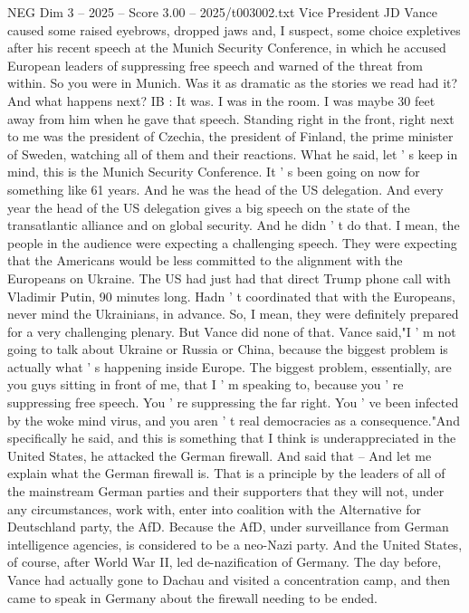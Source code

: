 \begin{textsample}{NEG Dim 3 – 2025 – Score 3.00 – 2025/t003002.txt}
Vice President JD Vance caused some raised eyebrows, dropped jaws and, I suspect, some choice expletives after his recent speech at the Munich Security Conference, in which he accused European leaders of suppressing free speech and warned of the threat from within.
So you were in Munich.
Was it as dramatic as the stories we read had it?
And what happens next?
IB : It was.
I was in the room.
I was maybe 30 feet away from him when he gave that speech.
Standing right in the front, right next to me was the president of Czechia, the president of Finland, the prime minister of Sweden, watching all of them and their reactions.
What he said, let ' s keep in mind, this is the Munich Security Conference.
It ' s been going on now for something like 61 years.
And he was the head of the US delegation.
And every year the head of the US delegation gives a big speech on the state of the transatlantic alliance and on global security.
And he didn ' t do that.
I mean, the people in the audience were expecting a challenging speech.
They were expecting that the Americans would be less committed to the alignment with the Europeans on Ukraine.
The US had just had that direct Trump phone call with Vladimir Putin, 90 minutes long.
Hadn ' t coordinated that with the Europeans, never mind the Ukrainians, in advance.
So, I mean, they were definitely prepared for a very challenging plenary.
But Vance did none of that.
Vance said,"I ' m not going to talk about Ukraine or Russia or China, because the biggest problem is actually what ' s happening inside Europe.
The biggest problem, essentially, are you guys sitting in front of me, that I ' m speaking to, because you ' re suppressing free speech.
You ' re suppressing the far right.
You ' ve been infected by the woke mind virus, and you aren ' t real democracies as a consequence."And specifically he said, and this is something that I think is underappreciated in the United States, he attacked the German firewall.
And said that -- And let me explain what the German firewall is.
That is a principle by the leaders of all of the mainstream German parties and their supporters that they will not, under any circumstances, work with, enter into coalition with the Alternative for Deutschland party, the AfD.
Because the AfD, under surveillance from German intelligence agencies, is considered to be a neo-Nazi party.
And the United States, of course, after World War II, led de-nazification of Germany.
The day before, Vance had actually gone to Dachau and visited a concentration camp, and then came to speak in Germany about the firewall needing to be ended.

\end{textsample}
